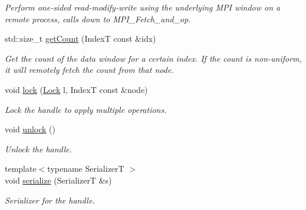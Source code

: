 \begin{DoxyCompactItemize}
\begin{DoxyCompactList}\small\item\em Perform one-\/sided read-\/modify-\/write using the underlying M\+PI window on a remote process, calls down to {\ttfamily M\+P\+I\+\_\+\+Fetch\+\_\+and\+\_\+op}. \end{DoxyCompactList}\item 
std\+::size\+\_\+t \hyperlink{structvt_1_1rdma_1_1_handle_3_01_t_00_01_e_00_01_index_t_00_01typename_01std_1_1enable__if__t_3_f66c3940d9f3649c3a5c3e77d63c658a_ad2cc71ceb8a965a56a6cd16181b00071}{get\+Count} (IndexT const \&idx)
\begin{DoxyCompactList}\small\item\em Get the count of the data window for a certain index. If the count is non-\/uniform, it will remotely fetch the count from that node. \end{DoxyCompactList}\item 
void \hyperlink{structvt_1_1rdma_1_1_handle_3_01_t_00_01_e_00_01_index_t_00_01typename_01std_1_1enable__if__t_3_f66c3940d9f3649c3a5c3e77d63c658a_a417746a96f30d65dc941ba3904a612cd}{lock} (\hyperlink{namespacevt_1_1rdma_ac5c20b41a653e520b6305d4d454ecb70}{Lock} l, IndexT const \&node)
\begin{DoxyCompactList}\small\item\em Lock the handle to apply multiple operations. \end{DoxyCompactList}\item 
void \hyperlink{structvt_1_1rdma_1_1_handle_3_01_t_00_01_e_00_01_index_t_00_01typename_01std_1_1enable__if__t_3_f66c3940d9f3649c3a5c3e77d63c658a_aeb8b31602a46bc22042360280ef88b01}{unlock} ()
\begin{DoxyCompactList}\small\item\em Unlock the handle. \end{DoxyCompactList}\item 
{\footnotesize template$<$typename SerializerT $>$ }\\void \hyperlink{structvt_1_1rdma_1_1_handle_3_01_t_00_01_e_00_01_index_t_00_01typename_01std_1_1enable__if__t_3_f66c3940d9f3649c3a5c3e77d63c658a_a861a97549fb4aaa9880401dbdf2e0a23}{serialize} (SerializerT \&s)
\begin{DoxyCompactList}\small\item\em Serializer for the handle. \end{DoxyCompactList}\end{DoxyCompactItemize}

